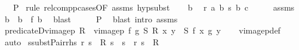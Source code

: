 \begin{isabellebody}
\ \ \ P\isanewline
%
\isadelimproof
%
\endisadelimproof
%
\isatagproof
{}\isamarkupfalse%
\ {\isacharparenleft}{\kern0pt}rule\ relcompp{\isachardot}{\kern0pt}cases{\isacharbrackleft}{\kern0pt}OF\ assms{\isacharparenleft}{\kern0pt}{}{\isacharparenright}{\kern0pt}{\isacharbrackright}{\kern0pt}{\isacharcomma}{\kern0pt}\ hypsubst{\isacharparenright}{\kern0pt}\isanewline
\ \ \isamarkupfalse%
\ b\ \isamarkupfalse%
\ {\isachardoublequoteopen}r\ a\ b{\isachardoublequoteclose}\ {\isachardoublequoteopen}s\ b\ c{\isachardoublequoteclose}\isanewline
\ \ \isamarkupfalse%
\ \isamarkupfalse%
\ assms{\isacharparenleft}{\kern0pt}{}{\isacharparenright}{\kern0pt}\ \isamarkupfalse%
\ b{\isacharprime}{\kern0pt}\ \ {\isachardoublequoteopen}b\ {\isacharequal}{\kern0pt}\ f\ b{\isacharprime}{\kern0pt}{\isachardoublequoteclose}\ \isamarkupfalse%
\ blast\isanewline
\ \ \isamarkupfalse%
\ \isamarkupfalse%
\ P\ \isamarkupfalse%
\ {\isacharparenleft}{\kern0pt}blast\ intro{\isacharcolon}{\kern0pt}\ assms{\isacharparenleft}{\kern0pt}{}{\isacharparenright}{\kern0pt}{\isacharparenright}{\kern0pt}\isanewline
{}\isamarkupfalse%
%
\endisatagproof
{\isafoldproof}%
%
\isadelimproof
\isanewline
%
\endisadelimproof
\isanewline
{}\isamarkupfalse%
\ predicate{}D{\isacharunderscore}{\kern0pt}vimage{}p{\isacharcolon}{\kern0pt}\ {\isachardoublequoteopen}{\isasymlbrakk}R\ {\isasymle}\ vimage{}p\ f\ g\ S{\isacharsemicolon}{\kern0pt}\ R\ x\ y{\isasymrbrakk}\ {\isasymLongrightarrow}\ S\ {\isacharparenleft}{\kern0pt}f\ x{\isacharparenright}{\kern0pt}\ {\isacharparenleft}{\kern0pt}g\ y{\isacharparenright}{\kern0pt}{\isachardoublequoteclose}\isanewline
%
\isadelimproof
\ \ %
\endisadelimproof
%
\isatagproof
{}\isamarkupfalse%
\ vimage{}p{\isacharunderscore}{\kern0pt}def\ \isamarkupfalse%
\ auto%
\endisatagproof
{\isafoldproof}%
%
\isadelimproof
\isanewline
%
\endisadelimproof
\isanewline
{}\isamarkupfalse%
\ ssubst{\isacharunderscore}{\kern0pt}Pair{\isacharunderscore}{\kern0pt}rhs{\isacharcolon}{\kern0pt}\ {\isachardoublequoteopen}{\isasymlbrakk}{\isacharparenleft}{\kern0pt}r{\isacharcomma}{\kern0pt}\ s{\isacharparenright}{\kern0pt}\ {\isasymin}\ R{\isacharsemicolon}{\kern0pt}\ s{\isacharprime}{\kern0pt}\ {\isacharequal}{\kern0pt}\ s{\isasymrbrakk}\ {\isasymLongrightarrow}\ {\isacharparenleft}{\kern0pt}r{\isacharcomma}{\kern0pt}\ s{\isacharprime}{\kern0pt}{\isacharparenright}{\kern0pt}\ {\isasymin}\ R{\isachardoublequoteclose}\isanewline

\end{isabellebody}
